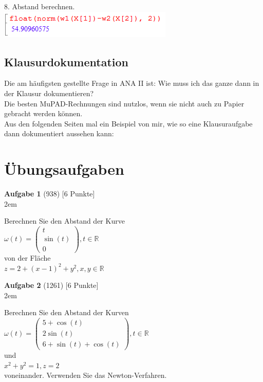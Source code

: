 \documentclass[11pt,final]{scrreprt}
\newcommand{\br} {\medskip\\}
\newcommand{\R} {\mathbb R}
\begin{document}
8. Abstand berechnen.\\

\includegraphics[scale=2.2]{images/abstandsproblem/abstand.png}

\subsection{Klausurdokumentation}

Die am häufigsten gestellte Frage in ANA II ist: Wie muss ich das ganze dann in der Klausur dokumentieren?\\
Die besten MuPAD-Rechnungen sind nutzlos, wenn sie nicht auch zu Papier gebracht werden können.\\
Aus den folgenden Seiten mal ein Beispiel von mir, wie so eine Klausuraufgabe dann dokumentiert aussehen kann:\\



\section{Übungsaufgaben}

\textbf{Aufgabe 1} (938) [6 Punkte]\\

\begingroup
\leftskip2em 

Berechnen Sie den Abstand der Kurve\br
$ \omega(t)=\left(\begin{matrix}
t\\ 
\sin(t)\\ 
0
\end{matrix}\right), t\in\R $\br
von der Fläche\\
$ z=2+(x-1)^2+y^2, x, y \in \R $\\

\par	
\endgroup

\textbf{Aufgabe 2} (1261) [6 Punkte]\\

\begingroup
\leftskip2em 

Berechnen Sie den Abstand der Kurven\br
$ \omega(t)=\left(\begin{matrix}
5+\cos(t)\\ 
2\sin(t)\\ 
6+\sin(t)+\cos(t)
\end{matrix}\right), t\in\R $\br
und\\
$ x^2+y^2=1, z=2 $\\
voneinander. Verwenden Sie das Newton-Verfahren.\\
\end{document}
